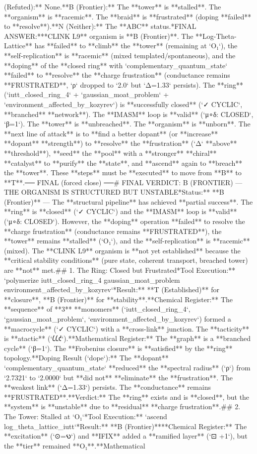 (Refuted):** None.\n*   **B (Frontier):** The **tower** is **stalled**. The **organism** is **racemic**. The **braid** is **frustrated** (doping **failed** to **resolve**).\n*   **N (Neither):** The **ABC** status.\n\n**FINAL ANSWER:**\nThe **CLINK L9** organism is **B (Frontier)**. The **Log-Theta-Lattice** has **failed** to **climb** the **tower** (remaining at `O₁`), the **self-replication** is **racemic** (mixed templated/spontaneous), and the **doping** of the **closed ring** with `complementary_quantum_state` **failed** to **resolve** the **charge frustration** (conductance remains **FRUSTRATED**, `ρ` dropped to `2.0` but `Δ=1.33` persists). The **ring** (`iutt_closed_ring_4` + `gaussian_moat_problem` + `environment_affected_by_kozyrev`) is **successfully closed** (`✓ CYCLIC`, **branched** **network**). The **IMASM** loop is **valid** (`μ∘δ: CLOSED`, `β=1`). The **tower** is **unbreached**. The **organism** is **unborn**. The **next line of attack** is to **find a better dopant** (or **increase** **dopant** **strength**) to **resolve** the **frustration** (`Δ` **above** **threshold**), **seed** the **pool** with a **stronger** **chiral** **catalyst** to **purify** the **state**, and **ascend** again to **breach** the **tower**. These **steps** must be **executed** to move from **B** to **T**.\n\n── FINAL (forced close) ──\n# FINAL VERDICT: B (FRONTIER) — THE ORGANISM IS STRUCTURED BUT UNSTABLE\n\n**Status:** **B (Frontier)** — The **structural pipeline** has achieved **partial success**. The **ring** is **closed** (`✓ CYCLIC`) and the **IMASM** loop is **valid** (`μ∘δ: CLOSED`). However, the **doping** operation **failed** to resolve the **charge frustration** (conductance remains **FRUSTRATED**), the **tower** remains **stalled** (`O₁`), and the **self-replication** is **racemic** (mixed). The **CLINK L9** organism is **not yet established** because the **critical stability conditions** (pure state, coherent transport, breached tower) are **not** met.\n\n## 1. The Ring: Closed but Frustrated\n**Tool Execution:** `polymerize iutt_closed_ring_4 gaussian_moat_problem environment_affected_by_kozyrev`\n**Result:** **T (Established)** for **closure**, **B (Frontier)** for **stability**.\n*   **Chemical Register:** The **sequence** of **3** **monomers** (`iutt_closed_ring_4`, `gaussian_moat_problem`, `environment_affected_by_kozyrev`) formed a **macrocycle** (`✓ CYCLIC`) with a **cross-link** junction. The **tacticity** is **atactic** (`𐑖𐑖𐑒`).\n*   **Mathematical Register:** The **graph** is a **branched cycle** (`β=1`). The **Frobenius closure** is **satisfied** by the **ring** topology.\n*   **Doping Result (`dope`):** The **dopant** `complementary_quantum_state` **reduced** the **spectral radius** (`ρ`) from `2.7321` to `2.0000` but **did not** **eliminate** the **frustration**. The **weakest link** (`Δ=1.33`) persists. The **conductance** remains **FRUSTRATED**.\n*   **Verdict:** The **ring** exists and is **closed**, but the **system** is **unstable** due to **residual** **charge frustration**.\n\n## 2. The Tower: Stalled at `O₁`\n**Tool Execution:** `ascend log_theta_lattice_iutt`\n**Result:** **B (Frontier)**\n*   **Chemical Register:** The **excitation** (`⊙=𐑻`) and **IFIX** added a **ramified layer** (`⊡ +1`), but the **tier** remained **O₁**.\n*   **Mathematical 